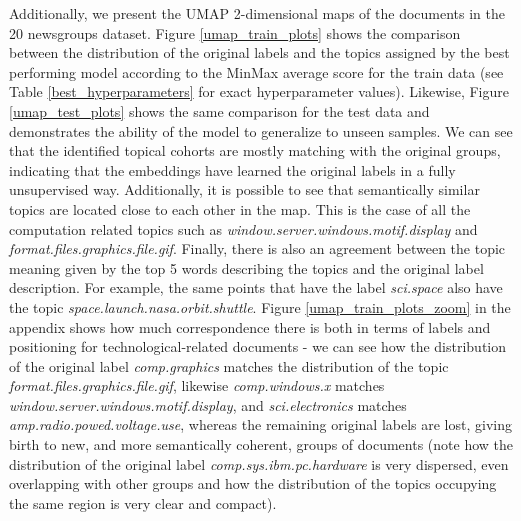 \documentclass[a4paper]{article}
\begin{document}
Additionally, we present the UMAP 2-dimensional maps of the documents in the 20 newsgroups dataset. Figure \ref{umap_train_plots} shows the comparison between the distribution of the original labels and the topics assigned by the best performing model according to the MinMax average score for the train data (see Table \ref{best_hyperparameters} for exact hyperparameter values). Likewise, Figure \ref{umap_test_plots} shows the same comparison for the test data and demonstrates the ability of the model to generalize to unseen samples. We can see that the identified topical cohorts are mostly matching with the original groups, indicating that the embeddings have learned the original labels in a fully unsupervised way. Additionally, it is possible to see that semantically similar topics are located close to each other in the map. This is the case of all the computation related topics such as \emph{window.server.windows.motif.display} and \emph{format.files.graphics.file.gif}. Finally, there is also an agreement between the topic meaning given by the top 5 words describing the topics and the original label description. For example, the same points that have the label \emph{sci.space} also have the topic \emph{space.launch.nasa.orbit.shuttle}. Figure \ref{umap_train_plots_zoom} in the appendix shows how much correspondence there is both in terms of labels and positioning for technological-related documents - we can see how the distribution of the original label \emph{comp.graphics} matches the distribution of the topic \emph{format.files.graphics.file.gif}, likewise \emph{comp.windows.x} matches \emph{window.server.windows.motif.display}, and \emph{sci.electronics} matches \emph{amp.radio.powed.voltage.use}, whereas the remaining original labels are lost, giving birth to new, and more semantically coherent, groups of documents (note how the distribution of the original label \emph{comp.sys.ibm.pc.hardware} is very dispersed, even overlapping with other groups and how the distribution of the topics occupying the same region is very clear and compact).
\end{document}
